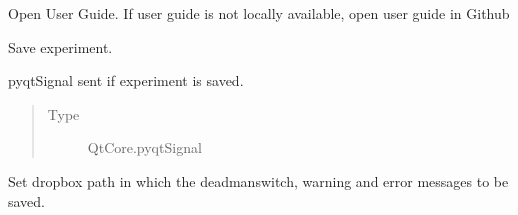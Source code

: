 \documentclass[letterpaper,10pt,english]{sphinxmanual}
\begin{document}
\begin{fulllineitems}
\begin{fulllineitems}
\end{fulllineitems}


\begin{fulllineitems}
\label{\detokenize{NoSeMazeControl/main:main.MainApp.open_user_guide}}
\pysigstartsignatures
{}
\pysigstopsignatures
\sphinxAtStartPar
Open User Guide. If user guide is not locally available,
open user guide in Github

\end{fulllineitems}


\begin{fulllineitems}
\label{\detokenize{NoSeMazeControl/main:main.MainApp.save_experiment}}
\pysigstartsignatures
{}
\pysigstopsignatures
\sphinxAtStartPar
Save experiment.

\end{fulllineitems}


\begin{fulllineitems}
\label{\detokenize{NoSeMazeControl/main:main.MainApp.saved}}
\pysigstartsignatures
{}
\pysigstopsignatures
\sphinxAtStartPar
pyqtSignal sent if experiment is saved.
\begin{quote}\begin{description}
\item[{Type}] \leavevmode
\sphinxAtStartPar
QtCore.pyqtSignal

\end{description}\end{quote}

\end{fulllineitems}


\begin{fulllineitems}
\label{\detokenize{NoSeMazeControl/main:main.MainApp.set_dropbox_path}}
\pysigstartsignatures
{}
\pysigstopsignatures
\sphinxAtStartPar
Set dropbox path in which the deadman\sphinxhyphen{}switch, warning and error messages to be saved.


\end{fulllineitems}
\end{fulllineitems}
\end{document}
